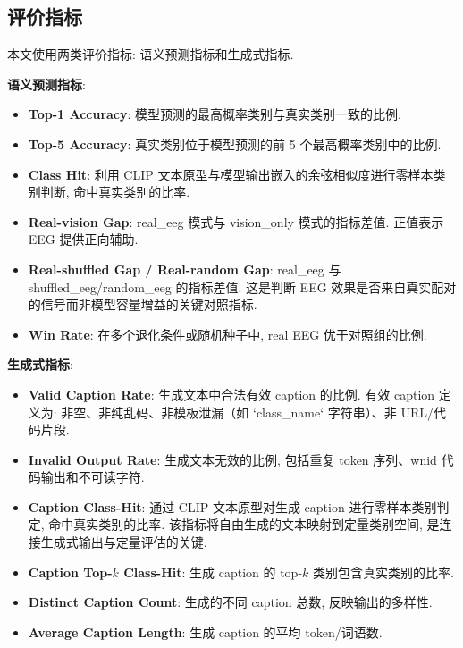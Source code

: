 \subsection{评价指标}

本文使用两类评价指标: 语义预测指标和生成式指标.

\textbf{语义预测指标}:

\begin{itemize}
  \item \textbf{Top-1 Accuracy}: 模型预测的最高概率类别与真实类别一致的比例.
  \item \textbf{Top-5 Accuracy}: 真实类别位于模型预测的前 5 个最高概率类别中的比例.
  \item \textbf{Class Hit}: 利用 CLIP 文本原型与模型输出嵌入的余弦相似度进行零样本类别判断, 命中真实类别的比率.
  \item \textbf{Real-vision Gap}: real\_eeg 模式与 vision\_only 模式的指标差值. 正值表示 EEG 提供正向辅助.
  \item \textbf{Real-shuffled Gap / Real-random Gap}: real\_eeg 与 shuffled\_eeg/random\_eeg 的指标差值. 这是判断 EEG 效果是否来自真实配对的信号而非模型容量增益的关键对照指标.
  \item \textbf{Win Rate}: 在多个退化条件或随机种子中, real EEG 优于对照组的比例.
\end{itemize}

\textbf{生成式指标}:

\begin{itemize}
  \item \textbf{Valid Caption Rate}: 生成文本中合法有效 caption 的比例. 有效 caption 定义为: 非空、非纯乱码、非模板泄漏（如 `class\_name` 字符串）、非 URL/代码片段.
  \item \textbf{Invalid Output Rate}: 生成文本无效的比例, 包括重复 token 序列、wnid 代码输出和不可读字符.
  \item \textbf{Caption Class-Hit}: 通过 CLIP 文本原型对生成 caption 进行零样本类别判定, 命中真实类别的比率. 该指标将自由生成的文本映射到定量类别空间, 是连接生成式输出与定量评估的关键.
  \item \textbf{Caption Top-$k$ Class-Hit}: 生成 caption 的 top-$k$ 类别包含真实类别的比率.
  \item \textbf{Distinct Caption Count}: 生成的不同 caption 总数, 反映输出的多样性.
  \item \textbf{Average Caption Length}: 生成 caption 的平均 token/词语数.
\end{itemize}

